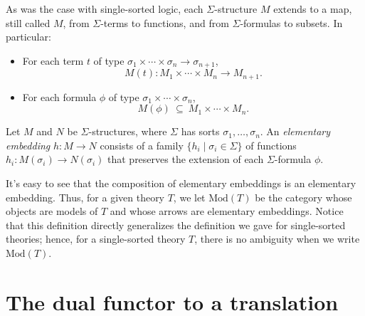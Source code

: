 As was the case with single-sorted logic, each $\Sigma$-structure
$M$ extends to a map, still called $M$, from $\Sigma$-terms to
functions, and from $\Sigma$-formulas to subsets.  In particular:
\begin{itemize}
\item For each term $t$ of type $\sigma _1\times\cdots\times\sigma
    _n\to \sigma _{n+1}$,
    \[ M(t):M_1\times\cdots\times M_n\to M_{n+1} . \]
  \item For each formula $\phi$ of type
    $\sigma _1\times\cdots\times \sigma _n$,
    \[ M(\phi )\: \subseteq \: M_1\times\cdots \times M_n
      .\]
  \end{itemize}

  \begin{defn} Let $M$ and $N$ be $\Sigma$-structures, where $\Sigma$
    has sorts $\sigma _1,\dots ,\sigma _n$.  An \emph{elementary
      embedding} $h:M\to N$ consists of a family
    $\{ h_i \mid \sigma _i \in \Sigma \}$ of functions
    $h_i :M(\sigma _i)\to N(\sigma _i)$ that preserves the extension
    of each $\Sigma$-formula $\phi$.  \label{eeman} \end{defn}

  It's easy to see that the composition of elementary embeddings is an
  elementary embedding.  Thus, for a given theory $T$, we let
  $\mathrm{Mod}(T)$ be the category whose objects are models of $T$
  and whose arrows are elementary embeddings.  Notice that this
  definition directly generalizes the definition we gave for
  single-sorted theories; hence, for a single-sorted theory $T$, there
  is no ambiguity when we write $\mathrm{Mod}(T)$.







\section{The dual functor to a translation} \label{sec:dual}

